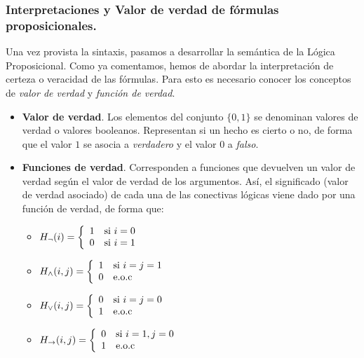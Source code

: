 \documentclass[a4paper]{report}
\begin{document}
\subsubsection{Interpretaciones y Valor de verdad de fórmulas proposicionales. }

Una vez provista la sintaxis, pasamos a desarrollar la semántica de la Lógica Proposicional. Como ya comentamos, hemos de abordar la interpretación de certeza o veracidad de las fórmulas. Para esto es necesario conocer los conceptos de \textit{valor de verdad} y \textit{función de verdad}.

\begin{itemize}
\item \textbf{Valor de verdad}. Los elementos del conjunto $\{0,1\}$ se denominan valores de verdad o valores booleanos. Representan si un hecho es cierto o no, de forma que el valor $1$ se asocia a \textit{verdadero} y el valor $0$ a \textit{falso}.

\item \textbf{Funciones de verdad}. Corresponden a funciones que devuelven un valor de verdad según el valor de verdad de los argumentos. Así, el significado (valor de verdad asociado) de cada una de las conectivas lógicas viene dado por una función de verdad, de forma que:

\begin{multicols}{2}
\begin{itemize}
\item 
$H_{\neg}(i) = \left\lbrace \begin{array}{l l}
1 & \textrm{si } i = 0\\
0 & \textrm{si } i = 1\\
\end{array} \right.$

\item 
$H_{\wedge}(i,j) = \left\lbrace \begin{array}{l l}
1 & \textrm{si } i = j = 1\\
0 & \textrm{e.o.c}\\
\end{array} \right.$

\item 
$H_{\vee}(i,j) = \left\lbrace \begin{array}{l l}
0 & \textrm{si } i = j = 0\\
1 & \textrm{e.o.c}\\
\end{array} \right.$

\item 
$H_{\rightarrow}(i,j) = \left\lbrace \begin{array}{l l}
0 & \textrm{si } i = 1, j = 0\\
1 & \textrm{e.o.c}\\
\end{array} \right.$


\end{itemize}
\end{multicols}
\end{itemize}
\end{document}
